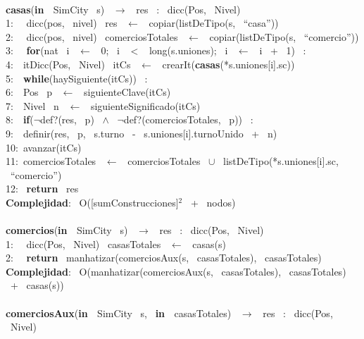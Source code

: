 \begin{Algoritmos}
{\makebox[\linewidth]{\rule{\textwidth}{0.4pt}}
\\
\makebox[\linewidth]{\rule{\textwidth}{0.4pt}}
\textbf{casas}(\textbf{in \ }SimCity \ s) \ $\rightarrow $ \ res \ : \ dicc(Pos, \ Nivel)\\
1: \  \ dicc(pos, \ nivel) \ res \ $\leftarrow$ \ copiar(listDeTipo(s, \ ``casa''))\\
2: \  \ dicc(pos, \ nivel) \ comerciosTotales \ $\leftarrow$ \ copiar(listDeTipo(s, \ ``comercio''))\\
3: \  \ \textbf{for}(nat \ i \ $\leftarrow$ \ 0; \ i \ $<$ \ long(s.uniones); \ i \ $\leftarrow$ \ i \ + \ 1) \ : \ \\
4:\indent  \  \ itDicc(Pos, \ Nivel) \ itCs \ $\leftarrow$ \ crearIt(\textbf{casas}(*s.uniones[i].sc))\\
5:\indent  \  \ \textbf{while}(haySiguiente(itCs)) \ :\\
6:\indent \indent  \  \ Pos \ p \ $\leftarrow$ \ siguienteClave(itCs)\\
7:\indent \indent  \  \ Nivel \ n \ $\leftarrow$ \ siguienteSignificado(itCs)\\
8:\indent \indent  \  \ \textbf{if}($\neg$def?(res, \ p) \ $\wedge$ \ $\neg$def?(comerciosTotales, \ p)) \ :\\
9:\indent \indent \indent  \  \ definir(res, \ p, \ s.turno \ - \ s.uniones[i].turnoUnido \ + \ n)\\
10:\indent \indent  \ avanzar(itCs)\\
11:\indent  \ comerciosTotales \ $\leftarrow$ \ comerciosTotales \ $\cup$ \ listDeTipo(*s.uniones[i].sc, \ ``comercio'')\\
12: \ \textbf{return} \ res\\
\textbf{Complejidad}: \ O([sumConstrucciones]$^2$ \ + \ nodos)\\
\makebox[\linewidth]{\rule{\textwidth}{0.4pt}}
\\
\makebox[\linewidth]{\rule{\textwidth}{0.4pt}}
\textbf{comercios}(\textbf{in \ }SimCity \ s) \ $\rightarrow $ \ res \ : \ dicc(Pos, \ Nivel)\\
1: \  \ dicc(Pos, \ Nivel) \ casasTotales \ $\leftarrow$ \ casas(s)\\
2: \  \ \textbf{return} \ manhatizar(comerciosAux(s, \ casasTotales), \ casasTotales)\\
\textbf{Complejidad}: \ O(manhatizar(comerciosAux(s, \ casasTotales), \ casasTotales) \ + \ casas(s))\\
\\
\textbf{comerciosAux}(\textbf{in \ }SimCity \ s, \ \textbf{in \ }casasTotales) \ $\rightarrow $ \ res \ : \ dicc(Pos, \ Nivel)\\
}
\end{Algoritmos}
